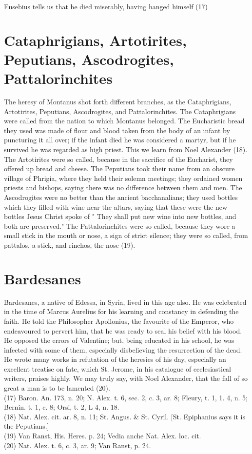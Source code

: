 \documentclass[12pt]{book}
\begin{document}
Eusebius tells us that he died miserably, having hanged himself (17)
\section{Cataphrigians, Artotirites, Peputians, Ascodrogites, Pattalorinchites}
The heresy of Montanus shot forth different branches, as the Cataphrigians, Artotirites, Peputians,
Ascodrogites, and Pattalorinchites. The Cataphrigians were called from the nation to which Montanus
belonged. The Eucharistic bread they used was made of flour and blood taken from the body of an infant
by puncturing it all over; if the infant died he was considered a martyr, but if he survived he was
regarded as high priest. This we learn from Noel Alexander (18). The Artotirites were so called, because
in the sacrifice of the Eucharist, they offered up bread and cheese. The Peputians took their name from an
obscure village of Phrigia, where they held their solemn meetings; they ordained women priests and
bishops, saying there was no difference between them and men. The Ascodrogites were no better than the
ancient bacchanalians; they used bottles which they filled with wine near the altars, saying that these
were the new bottles Jesus Christ spoke of " They shall put new wine into new bottles, and both are
preserved." The Pattalorinchites were so called, because they wore a small stick in the mouth or nose, a
sign of strict silence; they were so called, from pattalos, a stick, and rinchos, the nose (19).
\section{Bardesanes}
Bardesanes, a native of Edessa, in Syria, lived in this age also. He was celebrated in the time of Marcus
Aurelius for his learning and constancy in defending the faith. He told the Philosopher Apollonius, the
favourite of the Emperor, who endeavoured to pervert him, that he was ready to seal his belief with his
blood. He opposed the errors of Valentine; but, being educated in his school, he was infected with some
of them, especially disbelieving the resurrection of the dead. He wrote many works in refutation of the
heresies of his day, especially an excellent treatise on fate, which St. Jerome, in his catalogue of
ecclesiastical writers, praises highly. We may truly say, with Noel Alexander, that the fall of so great a
man is to be lamented (20).\\
(17) Baron. An. 173, n. 20; N. Alex. t. 6, sec. 2, c. 3, ar. 8; Fleury, t. 1, 1. 4, n. 5; Bernin. t. 1, c. 8; Orsi, t. 2, L
4, n. 18.\\
(18) Nat. Alex. cit. ar. 8, n. 11; St. Angus. \& St. Cyril. [St. Epiphanius says it is the Peputians.]\\
(19) Van Ranst, His. Heres. p. 24; Vedia anche Nat. Alex. loc. cit.\\
(20) Nat. Alex. t. 6, c. 3, ar. 9; Van Ranst, p. 24.\\
\end{document}
